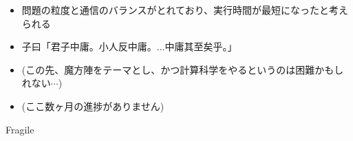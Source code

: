 \documentclass[a4paper,landscape,25pt]{foils}
\begin{document}
\begin{itemize}
\item 問題の粒度と通信のバランスがとれており、実行時間が最短になったと考えられる
\item 子曰「君子中庸。小人反中庸。...中庸其至矣乎。」
\end{itemize}

\begin{itemize}
\begin{itemize}
\item 現在のプログラムを6次としてT2K-Tsukubaで実行した場合150兆年かかる
\item アルゴリズムやプログラムの大幅な改良がない限り、6次魔方陣の求解は不可能
\end{itemize}
\item (この先、魔方陣をテーマとし、かつ計算科学をやるというのは困難かもしれない$\cdots$)
\item (ここ数ヶ月の進捗がありません)
\end{itemize}

Fragile
\end{document}
